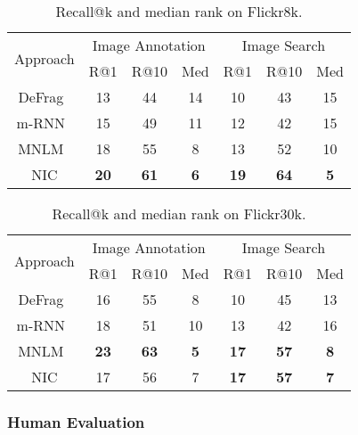 \begin{table}
\centering
\begin{small}
\setlength{\tabcolsep}{3pt}
\begin{tabular}{|c|ccc|ccc|}
 \hline
\multirow{2}{*}{Approach} & \multicolumn{3}{c|}{Image Annotation} & \multicolumn{3}{c|}{Image Search} \\
 & R@1 & R@10 & Med  &  R@1 & R@10 & Med  \\
\hline
\hline
DeFrag~\cite{karpathy2014deep} & 13 & 44 & 14             &    10 & 43 & 15  \\
m-RNN~\cite{baidu2014}         &  15 & 49 & 11               &  12 & 42 & 15\\
MNLM~\cite{kiros2014}        &  18   & 55 & 8        &  13 & 52 & 10   \\
\hline
NIC                            &  \bf{20} & \bf{61} & \bf{6}              &    \bf{19} & \bf{64} & \bf{5} \\
\hline
\end{tabular}
\end{small}
\caption{Recall@k and median rank on Flickr8k.\label{tab:recall@10}}
\end{table}

\begin{table}
\centering
\begin{small}
\setlength{\tabcolsep}{3pt}
\begin{tabular}{|c|ccc|ccc|}
\hline
\multirow{2}{*}{Approach} & \multicolumn{3}{c|}{Image Annotation} & \multicolumn{3}{c|}{Image Search} \\
 & R@1 & R@10 & Med  &  R@1 & R@10 & Med  \\
\hline
\hline
DeFrag~\cite{karpathy2014deep} & 16 & 55 & 8             &    10 & 45 & 13  \\
m-RNN~\cite{baidu2014}         &  18 & 51 & 10               &  13 & 42 & 16\\
MNLM~\cite{kiros2014}        &  \bf{23}   & \bf{63} & \bf{5}        &  \bf{17} & \bf{57} & \bf{8}   \\
\hline
NIC                            &  17 & 56  & 7               &    \bf{17} & \bf{57} & \bf{7} \\
\hline
\end{tabular}
\end{small}
\caption{Recall@k and median rank on Flickr30k.\label{tab:recall@1030k}}
\end{table}


\subsubsection{Human Evaluation}
\label{sec:human}


